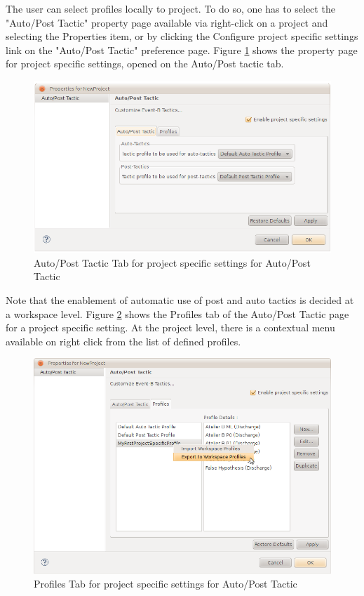 The user can select profiles locally to project. To do so, one has to select the "Auto/Post Tactic" property page available via right-click on a project and selecting the  Properties item, or by clicking the Configure project specific settings link on the "Auto/Post Tactic" preference page. Figure \ref{fig_ref_01_preferences11} shows the property page for project specific settings, opened on the Auto/Post tactic tab.

\begin{figure}[!h]
\begin{center}
	\includegraphics{img/reference/ref_01_preferences11.png}
	\caption{Auto/Post Tactic Tab for project specific settings for Auto/Post Tactic}
	\label{fig_ref_01_preferences11}
\end{center}
\end{figure}

Note that the enablement of automatic use of post and auto tactics is decided at a workspace level. Figure \ref{fig_ref_01_preferences12} shows the Profiles tab of the Auto/Post Tactic page for a project specific setting. At the project level, there is a contextual menu available on right click from the list of defined profiles. 

\begin{figure}[!h]
\begin{center}
	\includegraphics{img/reference/ref_01_preferences12.png}
	\caption{Profiles Tab for project specific settings for Auto/Post Tactic}
	\label{fig_ref_01_preferences12}
\end{center}
\end{figure}

